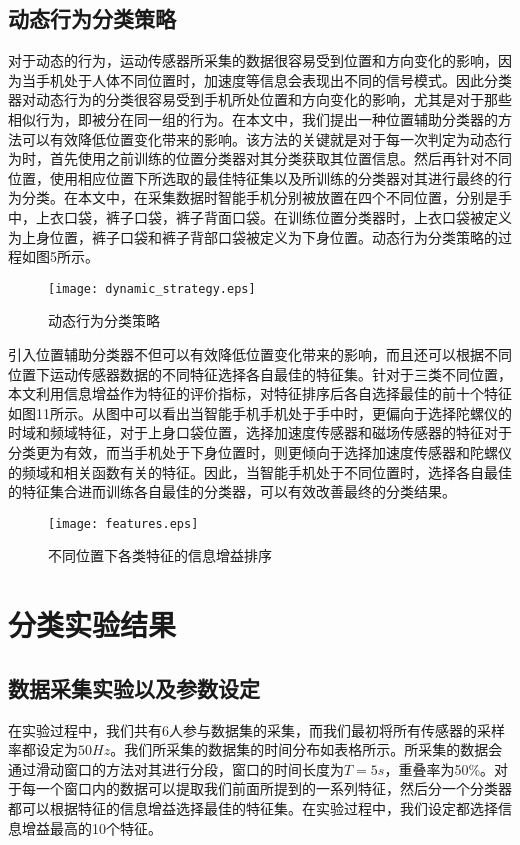 \subsection{动态行为分类策略}
\par 对于动态的行为，运动传感器所采集的数据很容易受到位置和方向变化的影响，因为当手机处于人体不同位置时，加速度等信息会表现出不同的信号模式。因此分类器对动态行为的分类很容易受到手机所处位置和方向变化的影响，尤其是对于那些相似行为，即被分在同一组的行为。在本文中，我们提出一种位置辅助分类器的方法可以有效降低位置变化带来的影响。该方法的关键就是对于每一次判定为动态行为时，首先使用之前训练的位置分类器对其分类获取其位置信息。然后再针对不同位置，使用相应位置下所选取的最佳特征集以及所训练的分类器对其进行最终的行为分类。在本文中，在采集数据时智能手机分别被放置在四个不同位置，分别是手中，上衣口袋，裤子口袋，裤子背面口袋。在训练位置分类器时，上衣口袋被定义为上身位置，裤子口袋和裤子背部口袋被定义为下身位置。动态行为分类策略的过程如图5所示。
\begin{figure}[!htp]
 \centering
 \texttt{[image: dynamic\_strategy.eps]}
 \caption{动态行为分类策略}
\end{figure}
\par 引入位置辅助分类器不但可以有效降低位置变化带来的影响，而且还可以根据不同位置下运动传感器数据的不同特征选择各自最佳的特征集。针对于三类不同位置，本文利用信息增益作为特征的评价指标，对特征排序后各自选择最佳的前十个特征如图11所示。从图中可以看出当智能手机手机处于手中时，更偏向于选择陀螺仪的时域和频域特征，对于上身口袋位置，选择加速度传感器和磁场传感器的特征对于分类更为有效，而当手机处于下身位置时，则更倾向于选择加速度传感器和陀螺仪的频域和相关函数有关的特征。因此，当智能手机处于不同位置时，选择各自最佳的特征集合进而训练各自最佳的分类器，可以有效改善最终的分类结果。
\begin{figure}[!htp]
 \centering
 \texttt{[image: features.eps]}
 \caption{不同位置下各类特征的信息增益排序}
\end{figure}

\section{分类实验结果}
\subsection{数据采集实验以及参数设定}
\par 在实验过程中，我们共有6人参与数据集的采集，而我们最初将所有传感器的采样率都设定为$50Hz$。我们所采集的数据集的时间分布如表格所示。所采集的数据会通过滑动窗口的方法对其进行分段，窗口的时间长度为$T=5s$，重叠率为50\%。对于每一个窗口内的数据可以提取我们前面所提到的一系列特征，然后分一个分类器都可以根据特征的信息增益选择最佳的特征集。在实验过程中，我们设定都选择信息增益最高的10个特征。

